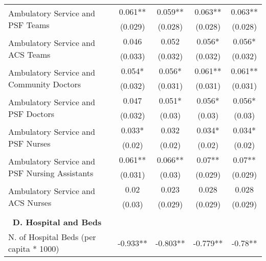 \begin{table}[H]
\begin{footnotesize}
\begin{center}
{\begin{threeparttable}[b]
\begin{tabular}{rrcccr}
    \multicolumn{1}{l}{\multirow{2}[0]{*}{Ambulatory Service and PSF Teams}} &       & 0.061** & 0.059** & 0.063** & \multicolumn{1}{c}{ 0.063** } \\
          &       & (0.029) & (0.028) & (0.028) & \multicolumn{1}{c}{ (0.028) } \\
    \multicolumn{1}{l}{\multirow{2}[0]{*}{Ambulatory Service and ACS Teams}} &       & 0.046 & 0.052 & 0.056* & \multicolumn{1}{c}{ 0.056* } \\
          &       & (0.033) & (0.032) & (0.032) & \multicolumn{1}{c}{ (0.032) } \\
    \multicolumn{1}{l}{\multirow{2}[0]{*}{Ambulatory Service and Community Doctors}} &       & 0.054* & 0.056* & 0.061** & \multicolumn{1}{c}{ 0.061** } \\
          &       & (0.032) & (0.031) & (0.031) & \multicolumn{1}{c}{ (0.031) } \\
    \multicolumn{1}{l}{\multirow{2}[0]{*}{Ambulatory Service and PSF Doctors}} &       & 0.047 & 0.051* & 0.056* & \multicolumn{1}{c}{ 0.056* } \\
          &       & (0.032) & (0.03) & (0.03) & \multicolumn{1}{c}{ (0.03) } \\
    \multicolumn{1}{l}{\multirow{2}[0]{*}{Ambulatory Service and PSF Nurses}} &       & 0.033* & 0.032 & 0.034* & \multicolumn{1}{c}{ 0.034* } \\
          &       & (0.02) & (0.02) & (0.02) & \multicolumn{1}{c}{ (0.02) } \\
    \multicolumn{1}{l}{\multirow{2}[0]{*}{Ambulatory Service and PSF Nursing Assistants}} &       & 0.061** & 0.066** & 0.07** & \multicolumn{1}{c}{ 0.07** } \\
          &       & (0.031) & (0.03) & (0.029) & \multicolumn{1}{c}{ (0.029) } \\
    \multicolumn{1}{l}{\multirow{2}[0]{*}{Ambulatory Service and ACS Nurses}} &       & 0.02  & 0.023 & 0.028 & \multicolumn{1}{c}{ 0.028 } \\
          &       & (0.03) & (0.029) & (0.029) & \multicolumn{1}{c}{ (0.029) } \\
          &       &       &       &       &  \\
    \midrule
    \multicolumn{1}{p{23.645em}}{\textbf{D. Hospital and Beds}} &       &       &       &       &  \\
    \multicolumn{1}{l}{\multirow{2}[0]{*}{N. of Hospital Beds (per capita * 1000)}} &       & -0.933** & -0.803** & -0.779** & \multicolumn{1}{c}{ -0.78** } \\

\end{tabular}
\end{threeparttable}}
\end{center}
\end{footnotesize}
\end{table}
